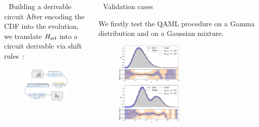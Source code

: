 \documentclass[20pt, final]{beamer}
\newlength{\colwidth}
\begin{document}
\begin{frame}[t]
\begin{columns}[t]
\begin{column}{\colwidth}
  \begin{block}{\faPencil\,\, Building a derivable circuit}
  After encoding the CDF into the evolution, we translate $H_{\rm ad}$ into a circuit
derivable via shift rules~\cite{Schuld_2019}:
  \begin{figure}
    \includegraphics[width=1\textwidth]{figures/cdf2pdf.pdf}
  \end{figure}
  \end{block}

\end{column}

\begin{column}{\colwidth}

 \begin{block}{\faCogs\,\, Validation cases}

  We firstly test the QAML procedure on a Gamma distribution and on a Gaussian 
  mixture.

    \begin{figure}
    \includegraphics[width=0.5\textwidth]{figures/gamma_pdf.pdf}%
    \includegraphics[width=0.5\textwidth]{figures/gauss_pdf.pdf}
    \end{figure}


\end{block}
\end{column}
\end{columns}
\end{frame}
\end{document}
